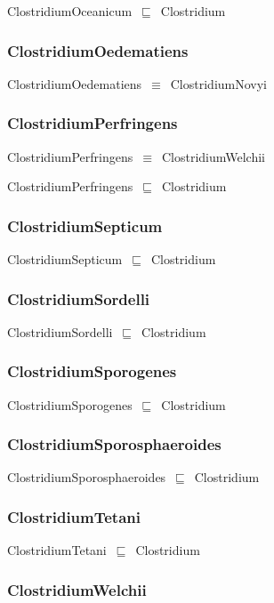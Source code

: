 \documentclass{article}
\begin{document}
ClostridiumOceanicum~\ensuremath{\sqsubseteq}~Clostridium~

\subsubsection*{ClostridiumOedematiens}

ClostridiumOedematiens~\ensuremath{\equiv}~ClostridiumNovyi

\subsubsection*{ClostridiumPerfringens}

ClostridiumPerfringens~\ensuremath{\equiv}~ClostridiumWelchii

ClostridiumPerfringens~\ensuremath{\sqsubseteq}~Clostridium~

\subsubsection*{ClostridiumSepticum}

ClostridiumSepticum~\ensuremath{\sqsubseteq}~Clostridium~

\subsubsection*{ClostridiumSordelli}

ClostridiumSordelli~\ensuremath{\sqsubseteq}~Clostridium~

\subsubsection*{ClostridiumSporogenes}

ClostridiumSporogenes~\ensuremath{\sqsubseteq}~Clostridium~

\subsubsection*{ClostridiumSporosphaeroides}

ClostridiumSporosphaeroides~\ensuremath{\sqsubseteq}~Clostridium~

\subsubsection*{ClostridiumTetani}

ClostridiumTetani~\ensuremath{\sqsubseteq}~Clostridium~

\subsubsection*{ClostridiumWelchii}
\end{document}
